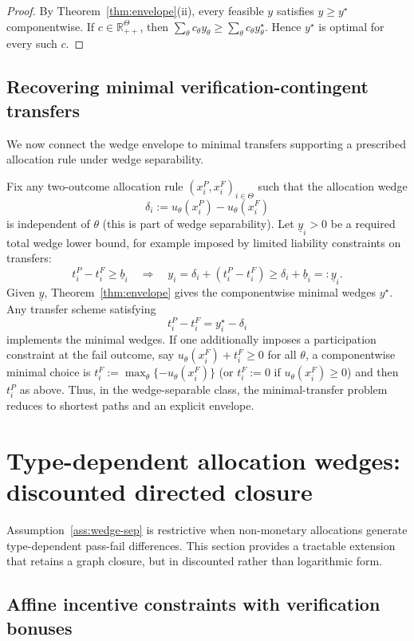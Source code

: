 \documentclass[final,3p,times]{elsarticle}
\theoremstyle{plain}
\theoremstyle{definition}
\newcommand{\R}{\mathbb{R}}
\newcommand{\1}{\mathbbm{1}}
\newcommand{\ThetaSet}{\Theta}
\begin{document}
\begin{proof}
By Theorem~\ref{thm:envelope}(ii), every feasible $y$ satisfies $y\ge y^\star$ componentwise.
If $c\in\R_{++}^{\ThetaSet}$, then $\sum_\theta c_\theta y_\theta\ge \sum_\theta c_\theta y^\star_\theta$.
Hence $y^\star$ is optimal for every such $c$.
\end{proof}


\subsection{Recovering minimal verification-contingent transfers}\label{sec:recover}

We now connect the wedge envelope to minimal transfers supporting a prescribed allocation rule under wedge separability.

Fix any two-outcome allocation rule $(x_i^P,x_i^F)_{i\in\ThetaSet}$ such that the allocation wedge
\[
\delta_i:=u_\theta(x_i^P)-u_\theta(x_i^F)
\]
is independent of $\theta$ (this is part of wedge separability). Let $\underline y_i>0$ be a required total wedge lower bound, for example imposed by limited liability constraints on transfers:
\[
t_i^P-t_i^F \ge \underline b_i \quad\Rightarrow\quad y_i=\delta_i+(t_i^P-t_i^F)\ge \delta_i+\underline b_i =:\underline y_i.
\]
Given $\underline y$, Theorem~\ref{thm:envelope} gives the componentwise minimal wedges $y^\star$. Any transfer scheme satisfying
\[
t_i^P-t_i^F = y_i^\star-\delta_i
\]
implements the minimal wedges. If one additionally imposes a participation constraint at the fail outcome, say $u_\theta(x_i^F)+t_i^F\ge 0$ for all $\theta$, a componentwise minimal choice is $t_i^F:=\max_\theta\{-u_\theta(x_i^F)\}$ (or $t_i^F:=0$ if $u_\theta(x_i^F)\ge 0$) and then $t_i^P$ as above. Thus, in the wedge-separable class, the minimal-transfer problem reduces to shortest paths and an explicit envelope.

\section{Type-dependent allocation wedges: discounted directed closure}

Assumption~\ref{ass:wedge-sep} is restrictive when non-monetary allocations generate type-dependent pass-fail differences. This section provides a tractable extension that retains a graph closure, but in discounted rather than logarithmic form.

\subsection{Affine incentive constraints with verification bonuses}
\end{document}
